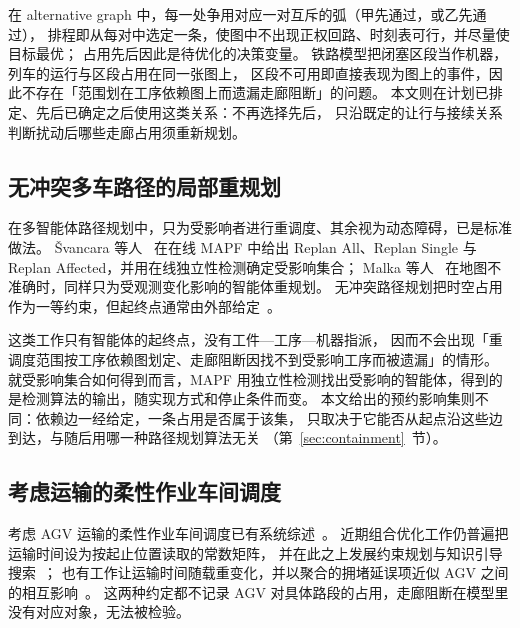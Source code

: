 \documentclass[manuscript,screen,review]{acmart}
\begin{document}
在 alternative graph 中，每一处争用对应一对互斥的弧（甲先通过，或乙先通过），
排程即从每对中选定一条，使图中不出现正权回路、时刻表可行，并尽量使目标最优；
占用先后因此是待优化的决策变量。
铁路模型把闭塞区段当作机器，列车的运行与区段占用在同一张图上，
区段不可用即直接表现为图上的事件，因此不存在「范围划在工序依赖图上而遗漏走廊阻断」的问题。
本文则在计划已排定、先后已确定之后使用这类关系：不再选择先后，
只沿既定的让行与接续关系判断扰动后哪些走廊占用须重新规划。

\subsection{无冲突多车路径的局部重规划}
\label{sec:rw_mapf}

在多智能体路径规划中，只为受影响者进行重调度、其余视为动态障碍，已是标准做法。
Švancara 等人~\cite{svancara2019online} 在在线 MAPF 中给出
Replan All、Replan Single 与 Replan Affected，并用在线独立性检测确定受影响集合；
Malka 等人~\cite{malka2024online} 在地图不准确时，同样只为受观测变化影响的智能体重规划。
无冲突路径规划把时空占用作为一等约束，但起终点通常由外部给定~\cite{zhang2024guidance}。

这类工作只有智能体的起终点，没有工件—工序—机器指派，
因而不会出现「重调度范围按工序依赖图划定、走廊阻断因找不到受影响工序而被遗漏」的情形。
就受影响集合如何得到而言，MAPF 用独立性检测找出受影响的智能体，得到的是检测算法的输出，随实现方式和停止条件而变。
本文给出的预约影响集则不同：依赖边一经给定，一条占用是否属于该集，
只取决于它能否从起点沿这些边到达，与随后用哪一种路径规划算法无关
（第~\ref{sec:containment}~节）。

\subsection{考虑运输的柔性作业车间调度}
\label{sec:rw_position}

考虑 AGV 运输的柔性作业车间调度已有系统综述~\cite{xin2025review}。
近期组合优化工作仍普遍把运输时间设为按起止位置读取的常数矩阵，
并在此之上发展约束规划与知识引导搜索~\cite{meng2025cp,qin2026knowledge}；
也有工作让运输时间随载重变化，并以聚合的拥堵延误项近似 AGV 之间的相互影响~\cite{jafarian2026integrated}。
这两种约定都不记录 AGV 对具体路段的占用，走廊阻断在模型里没有对应对象，无法被检验。
\end{document}
